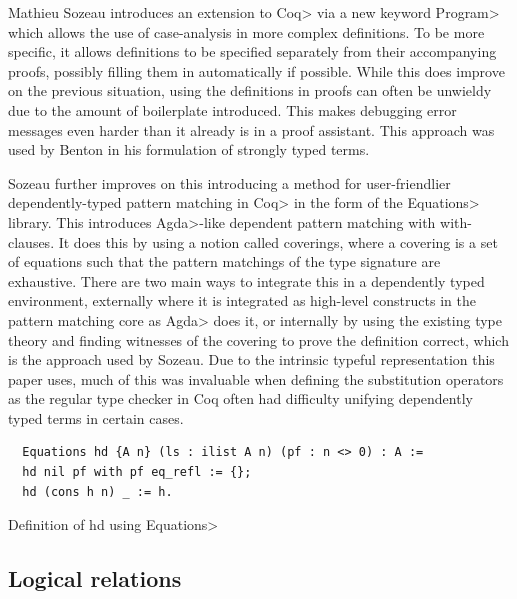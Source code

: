 \documentclass[11pt, final]{article}
\begin{document}
Mathieu Sozeau introduces an extension to \<Coq> via a new keyword \<Program> which allows the use of case-analysis in more complex definitions\cite{Sozeau2006}\cite{Sozeau2007}.
To be more specific, it allows definitions to be specified separately from their accompanying proofs, possibly filling them in automatically if possible.
While this does improve on the previous situation, using the definitions in proofs can often be unwieldy due to the amount of boilerplate introduced.
This makes debugging error messages even harder than it already is in a proof assistant. This approach was used by Benton in his formulation of strongly typed terms.

Sozeau further improves on this introducing a method for user-friendlier dependently-typed pattern matching in \<Coq> in the form of the \<Equations> library\cite{Sozeau2010}\cite{Sozeau2019}.
This introduces \<Agda>-like dependent pattern matching with with-clauses.
It does this by using a notion called coverings, where a covering is a set of equations such that the pattern matchings of the type signature are exhaustive.
There are two main ways to integrate this in a dependently typed environment, externally where it is integrated as high-level constructs in the pattern matching core as \<Agda> does it, or internally by using the existing type theory and finding witnesses of the covering to prove the definition correct, which is the approach used by Sozeau.
Due to the intrinsic typeful representation this paper uses, much of this was invaluable when defining the substitution operators as the regular type checker in Coq often had difficulty unifying dependently typed terms in certain cases.

\begin{listing}
  \begin{verbatim}
  Equations hd {A n} (ls : ilist A n) (pf : n <> 0) : A :=
  hd nil pf with pf eq_refl := {};
  hd (cons h n) _ := h.
  \end{verbatim}
  \caption{Definition of hd using \<Equations>}
  \label{lst:dt_ilist_hd_equations}
\end{listing}


\subsection{Logical relations}
\end{document}
